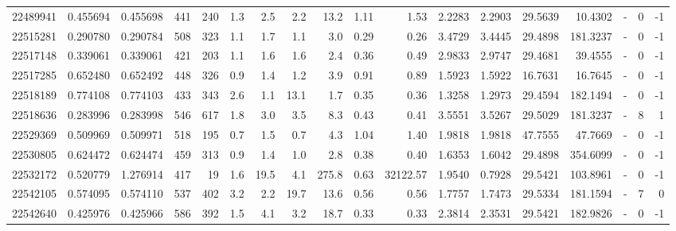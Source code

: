 \begin{tabular}{rrrrrrrrrrrrrrrlrr}
  22489941 & 0.455694 &   0.455698 &  441 &  240 &      1.3 &      2.5 &     2.2 &     13.2 &       1.11 &        1.53 &  2.2283 &  2.2903 &   29.5639 &   10.4302 &             - &        0 &         -1 \\
  22515281 & 0.290780 &   0.290784 &  508 &  323 &      1.1 &      1.7 &     1.1 &      3.0 &       0.29 &        0.26 &  3.4729 &  3.4445 &   29.4898 &  181.3237 &             - &        0 &         -1 \\
  22517148 & 0.339061 &   0.339061 &  421 &  203 &      1.1 &      1.6 &     1.6 &      2.4 &       0.36 &        0.49 &  2.9833 &  2.9747 &   29.4681 &   39.4555 &             - &        0 &         -1 \\
  22517285 & 0.652480 &   0.652492 &  448 &  326 &      0.9 &      1.4 &     1.2 &      3.9 &       0.91 &        0.89 &  1.5923 &  1.5922 &   16.7631 &   16.7645 &             - &        0 &         -1 \\
  22518189 & 0.774108 &   0.774103 &  433 &  343 &      2.6 &      1.1 &    13.1 &      1.7 &       0.35 &        0.36 &  1.3258 &  1.2973 &   29.4594 &  182.1494 &             - &        0 &         -1 \\
  22518636 & 0.283996 &   0.283998 &  546 &  617 &      1.8 &      3.0 &     3.5 &      8.3 &       0.43 &        0.41 &  3.5551 &  3.5267 &   29.5029 &  181.3237 &             - &        8 &          1 \\
  22529369 & 0.509969 &   0.509971 &  518 &  195 &      0.7 &      1.5 &     0.7 &      4.3 &       1.04 &        1.40 &  1.9818 &  1.9818 &   47.7555 &   47.7669 &             - &        0 &         -1 \\
  22530805 & 0.624472 &   0.624474 &  459 &  313 &      0.9 &      1.4 &     1.0 &      2.8 &       0.38 &        0.40 &  1.6353 &  1.6042 &   29.4898 &  354.6099 &             - &        0 &         -1 \\
  22532172 & 0.520779 &   1.276914 &  417 &   19 &      1.6 &     19.5 &     4.1 &    275.8 &       0.63 &    32122.57 &  1.9540 &  0.7928 &   29.5421 &  103.8961 &             - &        0 &         -1 \\
  22542105 & 0.574095 &   0.574110 &  537 &  402 &      3.2 &      2.2 &    19.7 &     13.6 &       0.56 &        0.56 &  1.7757 &  1.7473 &   29.5334 &  181.1594 &             - &        7 &          0 \\
  22542640 & 0.425976 &   0.425966 &  586 &  392 &      1.5 &      4.1 &     3.2 &     18.7 &       0.33 &        0.33 &  2.3814 &  2.3531 &   29.5421 &  182.9826 &             - &        0 &         -1 \\

\end{tabular}
